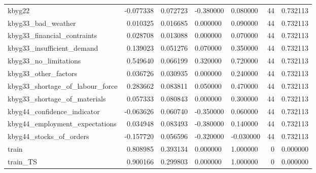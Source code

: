 \begin{landscape}
\begin{longtable}[h!]{lrrllrr}
kbyg22 & -0.077338 & 0.072723 & -0.380000 & 0.080000 & 44 & 0.732113 \\
kbyg33_bad_weather & 0.010325 & 0.016685 & 0.000000 & 0.090000 & 44 & 0.732113 \\
kbyg33_financial_contraints & 0.028708 & 0.013088 & 0.000000 & 0.070000 & 44 & 0.732113 \\
kbyg33_insufficient_demand & 0.139023 & 0.051276 & 0.070000 & 0.350000 & 44 & 0.732113 \\
kbyg33_no_limitations & 0.549640 & 0.066199 & 0.320000 & 0.720000 & 44 & 0.732113 \\
kbyg33_other_factors & 0.036726 & 0.030935 & 0.000000 & 0.240000 & 44 & 0.732113 \\
kbyg33_shortage_of_labour_force & 0.283662 & 0.083811 & 0.050000 & 0.470000 & 44 & 0.732113 \\
kbyg33_shortage_of_materials & 0.057333 & 0.080843 & 0.000000 & 0.300000 & 44 & 0.732113 \\
kbyg44_confidence_indicator & -0.063626 & 0.060740 & -0.350000 & 0.060000 & 44 & 0.732113 \\
kbyg44_employment_expectations & 0.034948 & 0.083493 & -0.380000 & 0.140000 & 44 & 0.732113 \\
kbyg44_stocks_of_orders & -0.157720 & 0.056596 & -0.320000 & -0.030000 & 44 & 0.732113 \\
train & 0.808985 & 0.393134 & 0.000000 & 1.000000 & 0 & 0.000000 \\
train_TS & 0.900166 & 0.299803 & 0.000000 & 1.000000 & 0 & 0.000000 \\
\end{longtable}\end{landscape}
